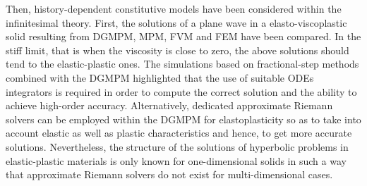 Then, history-dependent constitutive models have been considered within the infinitesimal theory.
First, the solutions of a plane wave in a elasto-viscoplastic solid resulting from DGMPM, MPM, FVM and FEM have been compared.
In the stiff limit, that is when the viscosity is close to zero, the above solutions should tend to the elastic-plastic ones.
The simulations based on fractional-step methods combined with the DGMPM highlighted that the use of suitable ODEs integrators is required in order to compute the correct solution and the ability to achieve high-order accuracy.
Alternatively, dedicated approximate Riemann solvers can be employed within the DGMPM for elastoplasticity so as to take into account elastic as well as plastic characteristics and hence, to get more accurate solutions.
Nevertheless, the structure of the solutions of hyperbolic problems in elastic-plastic materials is only known for one-dimensional solids in such a way that approximate Riemann solvers do not exist for multi-dimensional cases.

